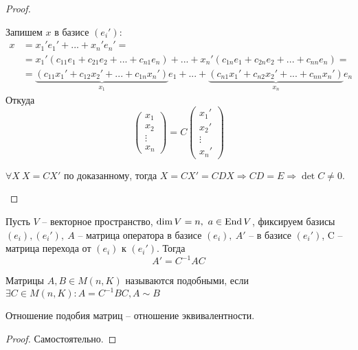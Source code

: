 \begin{proof}
	\begin{MyList}
		\item Запишем $x$ в базисе $(e_i')$:
		\begin{align*}
			x &= x_1' e_1' + ... + x_n'e_n' = \\
			&= x_1'(c_{11}e_1 + c_{21}e_2 +... + c_{n1}e_n) + ... + x_n'(c_{1n}e_1 + c_{2n}e_2 + ... + c_{nn}e_n) = \\
			&= \underbrace{(c_{11}x_1' + c_{12}x_2' + ... + c_{1n}x_n')}_{x_1} e_1 + ... + \underbrace{(c_{n1}x_1' + c_{n2}x_2' + ... + c_{nn}x_n')}_{x_n} e_n
		\end{align*}
		Откуда
		\[ \left(\begin{array}{c}
			x_1 \\ 
			x_2 \\ 
			\vdots \\ 
			x_n
			\end{array}\right) = C \left(\begin{array}{c}
			x_1' \\ 
			x_2' \\ 
			\vdots \\ 
			x_n'
			\end{array}\right)\]
		\item $ \forall X \ X = C X'$ по доказанному, тогда $ X = C X' = C D X \Rightarrow CD = E \Rightarrow \det C \neq 0$.
	\end{MyList}
\end{proof}

\begin{Thm}
	Пусть $V$ -- векторное пространство, $\dim V = n, \ a \in \operatorname{End} V$, фиксируем базисы $(e_i), (e_i'), \ A$ -- матрица оператора в базисе $(e_i), \ A'$ -- в базисе $(e_i')$, C -- матрица перехода от $(e_i) \text{ к } (e_i')$. Тогда
	$$A' = C^{-1} A C$$ 
\end{Thm}

\gdef\AuthorName{Ксения Кузьмина}

\begin{Def} 
	Матрицы $A, B \in M(n, K)$ называются подобными, если $\exists C \in M(n, K): A = C^{-1} B C, A \sim B$ 
\end{Def} 

\begin{Thm} 
	Отношение подобия матриц -- отношение эквивалентности. 
\end{Thm} 

\begin{proof}
	Самостоятельно. 
\end{proof}

